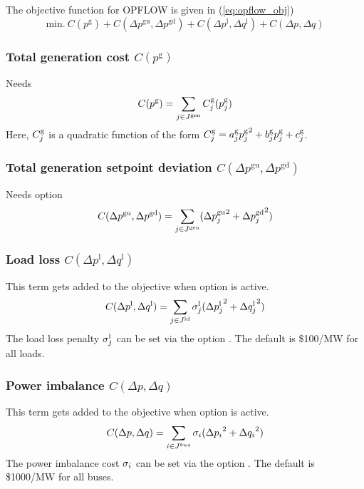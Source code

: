 The objective function for OPFLOW is given in (\ref{eq:opflow_obj})
\begin{equation}
\text{min.} ~ C(p^{\text{g}}) + C(\Delta p^{\text{gu}},\Delta p^{\text{gd}}) + C(\Delta p^{\text{l}},\Delta q^{\text{l}}) + C(\Delta p,\Delta q)
\label{eq:opflow_obj}
\end{equation}
 
\subsubsection{Total generation cost $C(p^{\text{g}})$}
Needs \opflowoption{\opflowobjective}{\mingencost}
\begin{equation}
C(p^{\text{g}}) = \sum_{j \in J^\text{gen}} C^\text{g}_j(p^\text{g}_j)
\label{eq:opf_obj_mingencost}
\end{equation}
Here, $C^\text{g}_j$ is a quadratic function of the form $C^\text{g}_j = a^\text{g}_j{p^\text{g}_j}^2 + b^\text{g}_jp^\text{g}_j + c^\text{g}_j$.

\subsubsection{Total generation setpoint deviation $C(\Delta p^{\text{gu}},\Delta p^{\text{gd}})$}
Needs \opflowoption{\opflowobjective}{\mingensetpointdeviation} option
\begin{equation}
C(\Delta p^{\text{gu}},\Delta p^{\text{gd}}) = \sum_{j \in J^\text{gen}} ({\Delta{p}^\text{gu}_j}^2 + {\Delta{p}^\text{gd}_j}^2)
\label{eq:opf_obj_mingensetpointdev}
\end{equation}

\subsubsection{Load loss $C(\Delta p^{\text{l}},\Delta q^{\text{l}})$}
This term gets added to the objective when  \option{\opflowincludeloadloss} option is active. 
\begin{equation}
C(\Delta p^{\text{l}},\Delta q^{\text{l}}) =  \sum_{j \in J^\text{ld}} \sigma^\text{l}_j({\Delta{p}^{\text{l}}_j}^2 + {\Delta{q}^{\text{l}}_j}^2)
\label{eq:opf_obj_minloadloss}
\end{equation}
The load loss penalty $\sigma^\text{l}_j$ can be set via the option . The default is \$100/MW for all loads.

\subsubsection{Power imbalance $C(\Delta p,\Delta q)$}
This term gets added to the objective when   option is active. 
\begin{equation}
C(\Delta p,\Delta q) =  \sum_{i \in J^{bus}} \sigma_i({\Delta p_i}^2 + {\Delta q_i}^2)
\label{eq:opf_obj_minpowerimbalance}
\end{equation}
The power imbalance cost $\sigma_i$ can be set via the option . The default is \$1000/MW for all buses.

